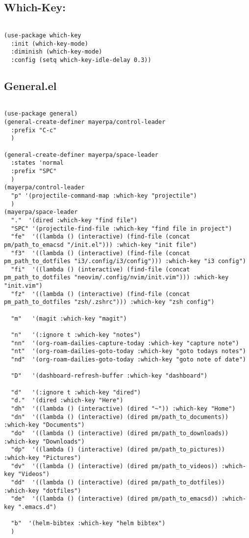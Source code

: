 \documentclass[11pt]{article}
\begin{document}
\subsection{Which-Key:}
\label{sec:org361939d}
\begin{verbatim}

(use-package which-key
  :init (which-key-mode)
  :diminish (which-key-mode)
  :config (setq which-key-idle-delay 0.3))

\end{verbatim}

\subsection{General.el}
\label{sec:orgd5607f5}
\begin{verbatim}

(use-package general)
(general-create-definer mayerpa/control-leader
  :prefix "C-c"
  )

(general-create-definer mayerpa/space-leader
  :states 'normal
  :prefix "SPC"
  )
(mayerpa/control-leader
  "p" '(projectile-command-map :which-key "projectile")
  )
(mayerpa/space-leader
  "."  '(dired :which-key "find file")
  "SPC" '(projectile-find-file :which-key "find file in project")
  "fe"  '((lambda () (interactive) (find-file (concat pm/path_to_emacsd "/init.el"))) :which-key "init file")
  "f3"  '((lambda () (interactive) (find-file (concat pm_path_to_dotfiles "i3/.config/i3/config"))) :which-key "i3 config")
  "fi"  '((lambda () (interactive) (find-file (concat pm_path_to_dotfiles "neovim/.config/nvim/init.vim"))) :which-key "init.vim")
  "fz"  '((lambda () (interactive) (find-file (concat pm_path_to_dotfiles "zsh/.zshrc"))) :which-key "zsh config")

  "m"   '(magit :which-key "magit")

  "n"   '(:ignore t :which-key "notes")
  "nn"  '(org-roam-dailies-capture-today :which-key "capture note")
  "nt"  '(org-roam-dailies-goto-today :which-key "goto todays notes")
  "nd"  '(org-roam-dailies-goto-today :which-key "goto note of date")

  "D"   '(dashboard-refresh-buffer :which-key "dashboard")

  "d"   '(:ignore t :which-key "dired")
  "d."  '(dired :which-key "Here")
  "dh"  '((lambda () (interactive) (dired "~")) :which-key "Home")
  "dn"  '((lambda () (interactive) (dired pm/path_to_documents)) :which-key "Documents")
  "do"  '((lambda () (interactive) (dired pm/path_to_downloads)) :which-key "Downloads")
  "dp"  '((lambda () (interactive) (dired pm/path_to_pictures)) :which-key "Pictures")
  "dv"  '((lambda () (interactive) (dired pm/path_to_videos)) :which-key "Videos")
  "dd"  '((lambda () (interactive) (dired pm/path_to_dotfiles)) :which-key "dotfiles")
  "de"  '((lambda () (interactive) (dired pm/path_to_emacsd)) :which-key ".emacs.d")

  "b"  '(helm-bibtex :which-key "helm bibtex")
  )

\end{verbatim}
\end{document}
